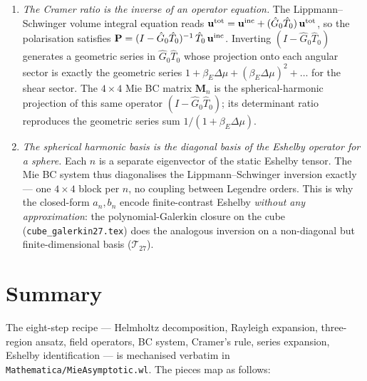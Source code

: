 \documentclass[11pt,a4paper]{article}
\newcommand{\D}{\Delta}
\newcommand{\code}[1]{\texttt{#1}}
\newcommand{\bu}{\mathbf{u}}
\newcommand{\bM}{\mathbf{M}}
\newcommand{\bP}{\mathbf{P}}
\begin{document}
\begin{enumerate}[leftmargin=*]
\item\emph{The Cramer ratio is the inverse of an operator equation.}
The Lippmann--Schwinger volume integral equation reads
$\bu^{\rm tot} = \bu^{\rm inc} + (\hat G_0 \hat T_0)\,\bu^{\rm tot}$,
so the polarisation satisfies
$\bP = (I-\hat G_0\hat T_0)^{-1}\,\hat T_0\,\bu^{\rm inc}$.  Inverting
$(I-\hat G_0\hat T_0)$ generates a geometric series in
$\hat G_0\hat T_0$ whose projection onto each angular sector is
exactly the geometric series $1 + \beta_E\D\mu + (\beta_E\D\mu)^2+\dots$
for the shear sector.  The $4\times 4$ Mie BC matrix $\bM_n$ is the
spherical-harmonic projection of this same operator $(I-\hat G_0\hat T_0)$;
its determinant ratio reproduces the geometric series sum
$1/(1+\beta_E\D\mu)$.

\item\emph{The spherical harmonic basis is the diagonal basis of the
Eshelby operator for a sphere.}  Each $n$ is a separate eigenvector of
the static Eshelby tensor.  The Mie BC system thus diagonalises the
Lippmann--Schwinger inversion exactly --- one $4\times 4$ block per
$n$, no coupling between Legendre orders.  This is why the closed-form
$a_n,b_n$ encode finite-contrast Eshelby \emph{without any
approximation}: the polynomial-Galerkin closure on the cube
(\code{cube\_galerkin27.tex}) does the analogous inversion on a
non-diagonal but finite-dimensional basis ($\mathcal{T}_{27}$).
\end{enumerate}

\section*{Summary}

The eight-step recipe --- Helmholtz decomposition, Rayleigh expansion,
three-region ansatz, field operators, BC system, Cramer's rule, series
expansion, Eshelby identification --- is mechanised verbatim in
\code{Mathematica/MieAsymptotic.wl}.  The pieces map as follows:
\end{document}
